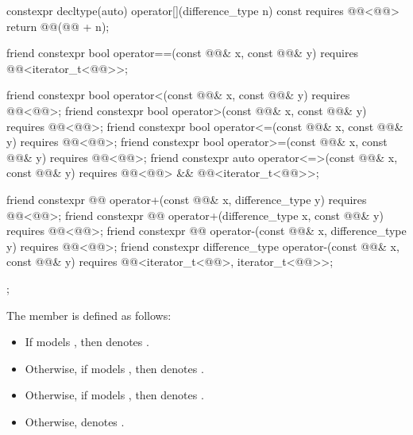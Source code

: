 \begin{codeblock}
{{    constexpr decltype(auto) operator[](difference_type n) const
      requires @@<@@>
    { return @@(@@ + n); }

    friend constexpr bool operator==(const @@& x, const @@& y)
      requires @@<iterator_t<@@>>;

    friend constexpr bool operator<(const @@& x, const @@& y)
      requires @@<@@>;
    friend constexpr bool operator>(const @@& x, const @@& y)
      requires @@<@@>;
    friend constexpr bool operator<=(const @@& x, const @@& y)
      requires @@<@@>;
    friend constexpr bool operator>=(const @@& x, const @@& y)
      requires @@<@@>;
    friend constexpr auto operator<=>(const @@& x, const @@& y)
      requires @@<@@> && @@<iterator_t<@@>>;

    friend constexpr @@ operator+(const @@& x, difference_type y)
      requires @@<@@>;
    friend constexpr @@ operator+(difference_type x, const @@& y)
      requires @@<@@>;
    friend constexpr @@ operator-(const @@& x, difference_type y)
      requires @@<@@>;
    friend constexpr difference_type operator-(const @@& x, const @@& y)
      requires @@<iterator_t<@@>, iterator_t<@@>>;
  };
}
\end{codeblock}

\pnum
The member  
is defined as follows:
\begin{itemize}
\item
If  models ,
then  denotes .
\item
Otherwise, if  models ,
then  denotes .
\item
Otherwise, if  models ,
then  denotes .
\item
Otherwise,  denotes .
\end{itemize}

